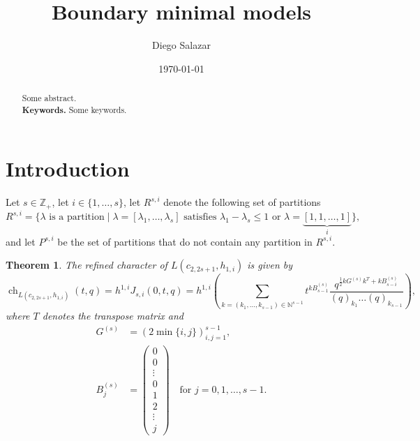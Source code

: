 \documentclass[a4paper, 12pt, reqno]{amsart}
\newtheorem{theorem}{Theorem}[section]
\theoremstyle{remark}
\DeclareMathOperator{\ch}{ch}
\begin{document}
\setcounter{section}{-1}

\begin{abstract}
  Some abstract. \\
  \smallskip
  \noindent \textbf{Keywords.} Some keywords.
\end{abstract}

\title{Boundary minimal models}
\author{Diego Salazar}
\address{Instituto de Matemática Pura e Aplicada, Rio de Janeiro, RJ, Brazil}
\date{\today}
\maketitle

\section{Introduction}
\label{sec:introduction}

Let $s \in \mathbb{Z}_+$, let $i \in \{1, \dots, s\}$, let $R^{s, i}$ denote the following set of partitions
\begin{equation*}
  R^{s, i} = \{\text{$\lambda$ is a partition} \mid \text{$\lambda = [\lambda_1, \dots, \lambda_s]$ satisfies $\lambda_1 - \lambda_s \le 1$ or $\lambda = \underbrace{[1, 1, \dots, 1]}_i$}\},
\end{equation*}
and let $P^{s, i}$ be the set of partitions that do not contain any partition in $R^{s, i}$.

\begin{theorem}
  \label{thr:1}
  The refined character of $L(c_{2, 2s + 1}, h_{1, i})$ is given by
  \begin{equation*}
    \ch_{L(c_{2, 2s + 1}, h_{1, i})}(t, q) = h^{1, i}J_{s, i}(0, t, q) = h^{1, i}\left(\sum_{k = (k_1, \dots, k_{s - 1}) \in \mathbb{N}^{s - 1}}t^{kB^{(s)}_{s - 1}}\frac{q^{\frac{1}{2}kG^{(s)}k^T + kB^{(s)}_{s - i}}}{(q)_{k_1}\dots(q)_{k_{s - 1}}}\right),
  \end{equation*}
  where $T$ denotes the transpose matrix and
  \begin{align*}
    G^{(s)} &= (2\min\{i, j\})_{i, j = 1}^{s - 1}, \\
    B^{(s)}_j &=
                \left(\begin{smallmatrix}
                  0 \\
                  0 \\
                  \vdots \\
                  0 \\
                  1 \\
                  2 \\
                  \vdots \\
                  j
                \end{smallmatrix}\right) \quad \text{for $j = 0, 1, \dots, s - 1$}.
  \end{align*}
\end{theorem}
\end{document}
